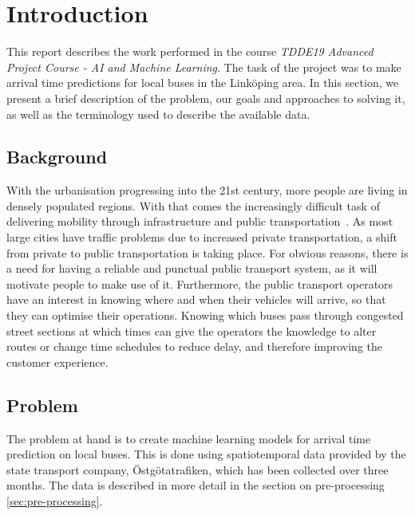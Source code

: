 


\chapter{Introduction}
\label{cha:introduction}
This report describes the work performed in the course \textit{TDDE19 Advanced Project Course - AI and Machine Learning}. The task of the project was to make arrival time predictions for local buses in the Link\"oping area. In this section, we present a brief description of the problem, our goals and approaches to solving it, as well as the terminology used to describe the available data.

\section{Background}
With the urbanisation progressing into the 21st century, more people are living in densely populated regions. With that comes the increasingly difficult task of delivering mobility through infrastructure and public transportation~\cite{kotter2004risks}. As most large cities have traffic problems due to increased private transportation, a shift from private to public transportation is taking place. For obvious reasons, there is a need for having a reliable and punctual public transport system, as it will motivate people to make use of it. Furthermore, the public transport operators have an interest in knowing where and when their vehicles will arrive, so that they can optimise their operations. Knowing which buses pass through congested street sections at which times can give the operators the knowledge to alter routes or change time schedules to reduce delay, and therefore improving the customer experience.

\section{Problem}
\label{sec:problem}
The problem at hand is to create machine learning models for arrival time prediction on local buses. This is done using spatiotemporal data provided by the state transport company, \"Ostg\"otatrafiken, which has been collected over three months. The data is described in more detail in the section on pre-processing \ref{sec:pre-processing}.

